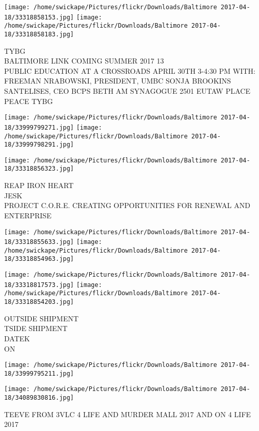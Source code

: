 \documentclass[10pt,letterpaper]{article}
\begin{document}
\texttt{[image: /home/swickape/Pictures/flickr/Downloads/Baltimore 2017-04-18/33318858153.jpg]}
\texttt{[image: /home/swickape/Pictures/flickr/Downloads/Baltimore 2017-04-18/33318858183.jpg]}

TYBG\\
BALTIMORE LINK COMING SUMMER 2017 13\\
PUBLIC EDUCATION AT A CROSSROADS APRIL 30TH 3{-}4:30 PM WITH: FREEMAN NRABOWSKI, PRESIDENT, UMBC SONJA BROOKINS SANTELISES, CEO BCPS BETH AM SYNAGOGUE 2501 EUTAW PLACE\\
PEACE TYBG
\pagebreak

\texttt{[image: /home/swickape/Pictures/flickr/Downloads/Baltimore 2017-04-18/33999799271.jpg]}
\texttt{[image: /home/swickape/Pictures/flickr/Downloads/Baltimore 2017-04-18/33999798291.jpg]}

\vspace{0.25in}
\texttt{[image: /home/swickape/Pictures/flickr/Downloads/Baltimore 2017-04-18/33318856323.jpg]}

REAP IRON HEART\\
JESK\\
PROJECT C.O.R.E. CREATING OPPORTUNITIES FOR RENEWAL AND ENTERPRISE
\pagebreak

\texttt{[image: /home/swickape/Pictures/flickr/Downloads/Baltimore 2017-04-18/33318855633.jpg]}
\texttt{[image: /home/swickape/Pictures/flickr/Downloads/Baltimore 2017-04-18/33318854963.jpg]}

\texttt{[image: /home/swickape/Pictures/flickr/Downloads/Baltimore 2017-04-18/33318817573.jpg]}
\texttt{[image: /home/swickape/Pictures/flickr/Downloads/Baltimore 2017-04-18/33318854203.jpg]}

OUTSIDE SHIPMENT\\
TSIDE SHIPMENT\\
DATEK\\
ON
\pagebreak

\texttt{[image: /home/swickape/Pictures/flickr/Downloads/Baltimore 2017-04-18/33999795211.jpg]}

\vspace{0.25in}
\texttt{[image: /home/swickape/Pictures/flickr/Downloads/Baltimore 2017-04-18/34089830816.jpg]}

TEEVE FROM 3VLC 4 LIFE AND MURDER MALL 2017 AND ON 4 LIFE\\
2017
\pagebreak
\end{document}
